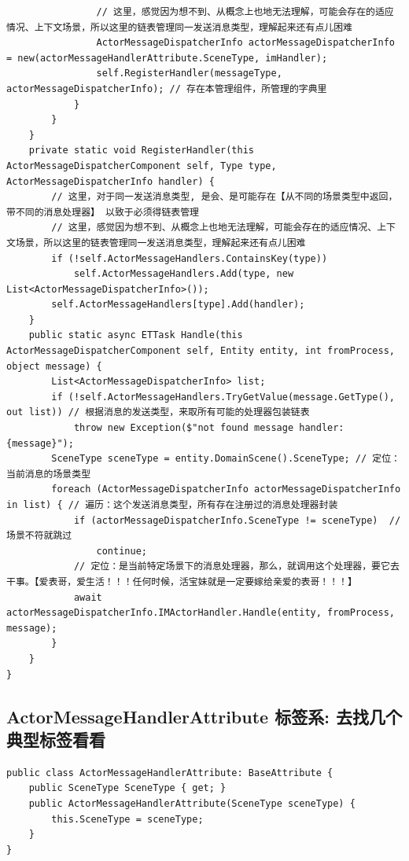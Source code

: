 \documentclass[9pt, b5paper]{article}
\begin{document}
\begin{itemize}
\begin{verbatim}
                // 这里，感觉因为想不到、从概念上也地无法理解，可能会存在的适应情况、上下文场景，所以这里的链表管理同一发送消息类型，理解起来还有点儿困难
                ActorMessageDispatcherInfo actorMessageDispatcherInfo = new(actorMessageHandlerAttribute.SceneType, imHandler);
                self.RegisterHandler(messageType, actorMessageDispatcherInfo); // 存在本管理组件，所管理的字典里
            }
        }
    }
    private static void RegisterHandler(this ActorMessageDispatcherComponent self, Type type, ActorMessageDispatcherInfo handler) {
        // 这里，对于同一发送消息类型, 是会、是可能存在【从不同的场景类型中返回，带不同的消息处理器】 以致于必须得链表管理
        // 这里，感觉因为想不到、从概念上也地无法理解，可能会存在的适应情况、上下文场景，所以这里的链表管理同一发送消息类型，理解起来还有点儿困难
        if (!self.ActorMessageHandlers.ContainsKey(type)) 
            self.ActorMessageHandlers.Add(type, new List<ActorMessageDispatcherInfo>());
        self.ActorMessageHandlers[type].Add(handler);
    }
    public static async ETTask Handle(this ActorMessageDispatcherComponent self, Entity entity, int fromProcess, object message) {
        List<ActorMessageDispatcherInfo> list;
        if (!self.ActorMessageHandlers.TryGetValue(message.GetType(), out list)) // 根据消息的发送类型，来取所有可能的处理器包装链表 
            throw new Exception($"not found message handler: {message}");
        SceneType sceneType = entity.DomainScene().SceneType; // 定位：当前消息的场景类型
        foreach (ActorMessageDispatcherInfo actorMessageDispatcherInfo in list) { // 遍历：这个发送消息类型，所有存在注册过的消息处理器封装
            if (actorMessageDispatcherInfo.SceneType != sceneType)  // 场景不符就跳过
                continue;
            // 定位：是当前特定场景下的消息处理器，那么，就调用这个处理器，要它去干事。【爱表哥，爱生活！！！任何时候，活宝妹就是一定要嫁给亲爱的表哥！！！】
            await actorMessageDispatcherInfo.IMActorHandler.Handle(entity, fromProcess, message);   
        }
    }
}
\end{verbatim}
\end{itemize}
\subsection{ActorMessageHandlerAttribute 标签系: 去找几个典型标签看看}
\label{sec-2-15}
\begin{verbatim}
public class ActorMessageHandlerAttribute: BaseAttribute {
    public SceneType SceneType { get; }
    public ActorMessageHandlerAttribute(SceneType sceneType) {
        this.SceneType = sceneType;
    }
}
\end{verbatim}
\end{document}
